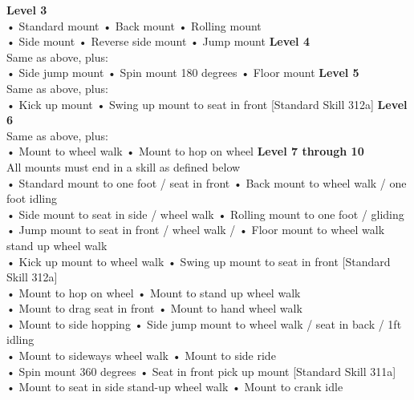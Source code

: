 \textbf{Level 3}\\
• Standard mount • Back mount • Rolling mount\\
• Side mount • Reverse side mount • Jump mount
\textbf{Level 4} \\
Same as above, plus:\\
• Side jump mount • Spin mount 180 degrees • Floor mount
\textbf{Level 5} \\
Same as above, plus:\\
• Kick up mount • Swing up mount to seat in front [Standard Skill 312a]
\textbf{Level 6}\\
Same as above, plus:\\
• Mount to wheel walk • Mount to hop on wheel  
\textbf{Level 7 through 10}\\
All mounts must end in a skill as defined below\\
• Standard mount to one foot / seat in front • Back mount to wheel walk / one foot idling\\
• Side mount to seat in side / wheel walk • Rolling mount to one foot / gliding\\
• Jump mount to seat in front / wheel walk /
• Floor mount to wheel walk
 stand up wheel walk\\
• Kick up mount to wheel walk
• Swing up mount to seat in front [Standard Skill 312a]\\
• Mount to hop on wheel
• Mount to stand up wheel walk\\
• Mount to drag seat in front
• Mount to hand wheel walk\\
• Mount to side hopping
• Side jump mount to wheel walk / seat in back / 1ft idling\\
• Mount to sideways wheel walk
• Mount to side ride\\
• Spin mount 360 degrees
• Seat in front pick up mount [Standard Skill 311a]\\
• Mount to seat in side stand-up wheel walk
• Mount to crank idle\\

\newpage



